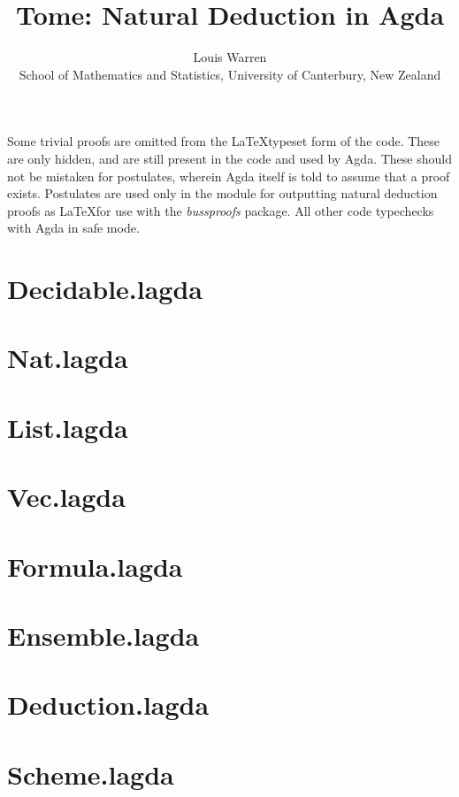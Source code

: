 \documentclass{article}
\begin{document}
\title{Tome: Natural Deduction in Agda}
\author{
Louis Warren \\
School of Mathematics and Statistics, University of Canterbury, New Zealand
}
\date{}
\maketitle

Some trivial proofs are omitted from the \LaTeX typeset form of the code. These
are only hidden, and are still present in the code and used by Agda. These
should not be mistaken for postulates, wherein Agda itself is told to assume
that a proof exists. Postulates are used only in the module for outputting
natural deduction proofs as \LaTeX for use with the \emph{bussproofs} package.
All other code typechecks with Agda in safe mode.

\section{Decidable.lagda}


\section{Nat.lagda}


\section{List.lagda}


\section{Vec.lagda}


\section{Formula.lagda}


\section{Ensemble.lagda}


\section{Deduction.lagda}


\section{Scheme.lagda}


{}

\end{document}

